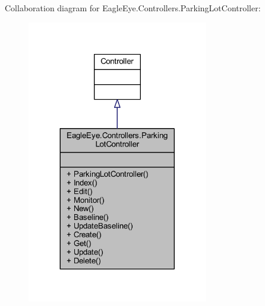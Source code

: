 Collaboration diagram for Eagle\+Eye.\+Controllers.\+Parking\+Lot\+Controller\+:
\nopagebreak
\begin{figure}[H]
\begin{center}
\leavevmode
\includegraphics[width=224pt]{class_eagle_eye_1_1_controllers_1_1_parking_lot_controller__coll__graph}
\end{center}
\end{figure}

